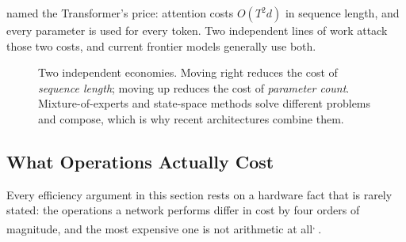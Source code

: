  named the Transformer's price: attention costs
$O(T^2 d)$ in sequence length, and every parameter is used for every token.
Two independent lines of work attack those two costs, and current frontier
models generally use both.

\begin{figure}[htbp]
\centering
{}
\caption{Two independent economies. Moving right reduces the cost of
\emph{sequence length}; moving up reduces the cost of \emph{parameter count}.
Mixture-of-experts and state-space methods solve different problems and
compose, which is why recent architectures combine them.}
\label{fig:dl-architecture-axes}
\end{figure}

\subsection{What Operations Actually Cost}

Every efficiency argument in this section rests on a hardware fact that is
rarely stated: the operations a network performs differ in cost by four orders
of magnitude, and the most expensive one is not arithmetic at
all\textsuperscript{\cite{horowitzComputingsEnergyProblem2014},
\cite{fogInstructionTables2026}}.

